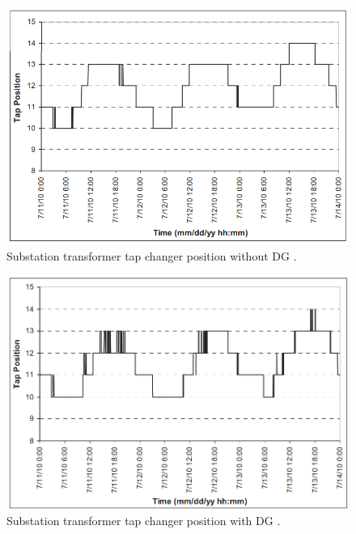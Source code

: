 \begin{figure}[!h]
\centering
\includegraphics[width=0.85\linewidth]{figs/VR4.png}
\caption[Substation transformer tap changer position without DG]{Substation transformer tap changer position without DG \cite{GKA11}.}
\label{fig:VR4}
\end{figure}
 
 \begin{figure}[!h]
\centering
\includegraphics[width=0.85\linewidth]{figs/VR5.png}
\caption[Substation transformer tap changer position with DG.]{Substation transformer tap changer position with DG \cite{GKA11}.}
\label{fig:VR5}
\end{figure}

